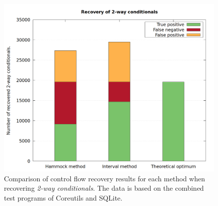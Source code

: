 \begin{figure}[htbp]
	\centering
	\includegraphics[width=\textwidth]{inc/5_results/results_2-way.png}
	\caption{Comparison of control flow recovery results for each method when recovering \textit{2-way conditionals}. The data is based on the combined test programs of Coreutils and SQLite.}
	\label{fig:total_results_2way}
\end{figure}
